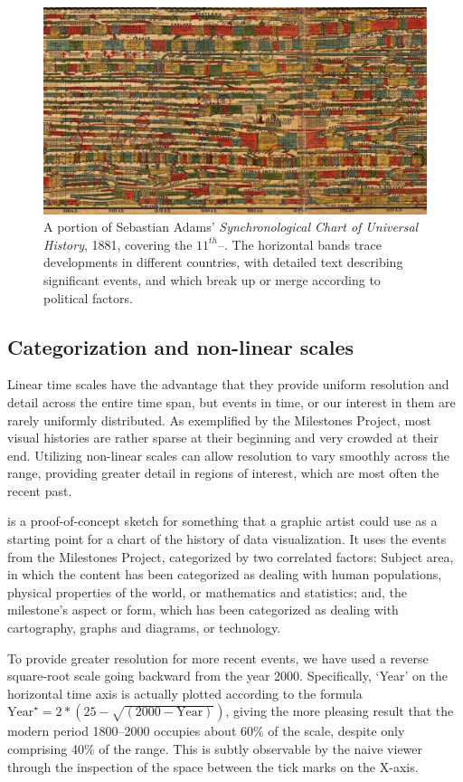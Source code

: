 \begin{figure}[!htb]
  \centering
  \includegraphics[width=\textwidth,clip]{fig/Adams1881-4}
  \caption{A portion of Sebastian Adams' \emph{Synchronological Chart of Universal History}, 1881, covering the $11^{th}$--. The horizontal bands trace developments in different countries, with detailed text describing significant events, and which break up or merge according to political factors.}
  \label{fig:Adams1881}
\end{figure}

\subsection{Categorization and non-linear scales}
Linear time scales have the advantage that they provide uniform resolution and detail across the entire time span, but events in time, or our interest in them are rarely uniformly distributed. As exemplified by the Milestones Project, most visual histories are rather sparse at their beginning and very crowded at their end. Utilizing non-linear scales can allow resolution to vary smoothly across the range, providing greater detail in regions of interest, which are most often the recent past.

 is a proof-of-concept sketch for something that a graphic artist could use as a starting point for a chart of the history of data visualization. It uses the events from the Milestones Project, categorized by two correlated factors: Subject area, in which the content has been categorized as dealing with human populations, physical properties of the world, or mathematics and statistics; and, the milestone's aspect or form, which has been categorized as dealing with cartography, graphs and diagrams, or technology. 

To provide greater resolution for more recent events, we have used a reverse square-root scale going backward from the year 2000. Specifically, `Year' on the horizontal time axis is actually plotted according to the formula $\textrm{Year}^\star = 2* (25 - \sqrt{(2000 - \textrm{Year})})$, giving the more pleasing result that the modern period 1800--2000 occupies about 60\% of the scale, despite only comprising 40\% of the range.  This is subtly observable by the naive viewer through the inspection of the space between the tick marks on the X-axis.

